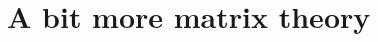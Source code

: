 \documentclass[../main.tex]{subfiles}
\begin{document}
 \section{A bit more matrix theory}

%
%
%
%
%
%
%
%
%
\end{document}
